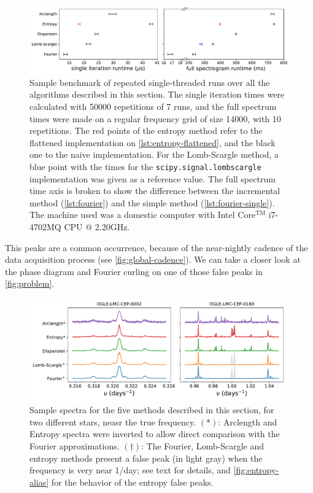 \begin{figure}
	\centering
	\includegraphics[width=\textwidth]{img/runtimes.pdf}
	\caption[Illustrative benchmark for the algorithms]{
		Sample benchmark of repeated single-threaded runs over all the algorithms described in this section.
		The single iteration times were calculated with 50000 repetitions of 7 runs, 
		and the full spectrum times were made on a regular frequency grid of size 14000, with 10 repetitions.
		The red points of the entropy method refer to the flattened implementation on \autoref{lst:entropy-flattened},
		and the black one to the naive implementation.
		For the Lomb-Scargle method, a blue point with the times for the \texttt{scipy.signal.lombscargle} implementation was given as a reference value.
		The full spectrum time axis is broken to show the difference between the incremental method (\autoref{lst:fourier}) and the simple method (\autoref{lst:fourier-single}).
		The machine used was a domestic computer with Intel \textregistered{} Core$^{\text{TM}}$ i7-4702MQ CPU @ 2.20GHz.
	}
	\label{fig:runtimes}
\end{figure}

This peaks are a common occurrence, because of the near-nightly cadence of the data acquisition process (see \autoref{fig:global-cadence}).
We can take a closer look at the phase diagram and Fourier curling on one of those false peaks in \autoref{fig:problem}.

\begin{figure}
	\centering
	\includegraphics[width=0.99\textwidth]{img/examples.pdf}
	\caption[Example of spectra near the true frequency]{
		Sample spectra for the five methods described in this section, for two different stars, neasr the true frequency.
		$(\ast)$: Arclength and Entropy spectra were inverted to allow direct comparison with the Fourier approximations.
		$(\dagger)$: The Fourier, Lomb-Scargle and entropy methods present a false peak (in light gray) 
		when the frequency is very near 1/day; see text for details, and \autoref{fig:entropy-alias} for the behavior of the entropy false peaks.
	}
	\label{fig:examples}
\end{figure}

